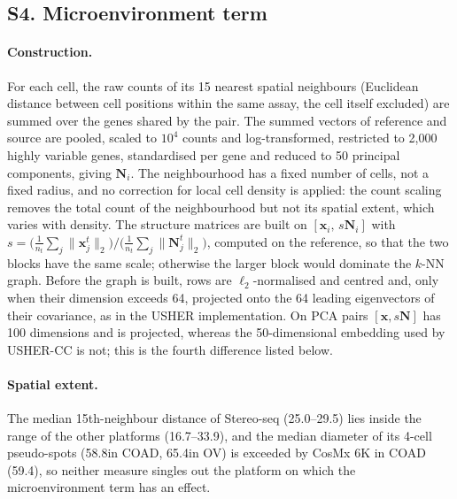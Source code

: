 \subsection*{S4. Microenvironment term}\label{sec:supp_niche}
\paragraph{Construction.} For each cell, the raw counts of its 15 nearest spatial neighbours (Euclidean distance
between cell positions within the same assay, the cell itself excluded) are summed over the genes shared by the pair.
The summed vectors of reference and source are pooled, scaled to $10^{4}$ counts and log-transformed, restricted to
2{,}000 highly variable genes, standardised per gene and reduced to 50 principal components, giving $\mathbf{N}_i$.
The neighbourhood has a fixed number of cells, not a fixed radius, and no correction for local cell density is
applied: the count scaling removes the total count of the neighbourhood but not its spatial extent, which varies with
density. The structure matrices are built on $[\mathbf{x}_i,\,s\mathbf{N}_i]$ with
$s=\bigl(\tfrac{1}{n_t}\sum_j\|\mathbf{x}^{t}_j\|_2\bigr)\big/\bigl(\tfrac{1}{n_t}\sum_j\|\mathbf{N}^{t}_j\|_2\bigr)$,
computed on the reference, so that the two blocks have the same scale; otherwise the larger block would dominate the
$k$-NN graph. Before the graph is built, rows are $\ell_2$-normalised and centred and, only when their dimension
exceeds 64, projected onto the 64 leading eigenvectors of their covariance, as in the USHER implementation. On PCA
pairs $[\mathbf{x},s\mathbf{N}]$ has 100 dimensions and is projected, whereas the 50-dimensional embedding used by
USHER-CC is not; this is the fourth difference listed below.

\paragraph{Spatial extent.} The median 15th-neighbour distance of Stereo-seq (25.0--29.5\um) lies inside the range of
the other platforms (16.7--33.9\um), and the median diameter of its 4-cell pseudo-spots (58.8\um in COAD, 65.4\um in
OV) is exceeded by CosMx 6K in COAD (59.4\um), so neither measure singles out the platform on which the
microenvironment term has an effect.

